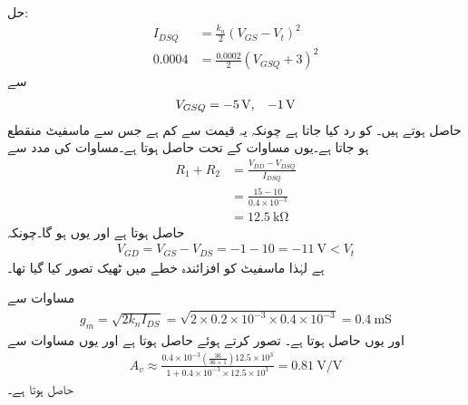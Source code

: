 حل:
\begin{align*}
I_{DSQ}&=\frac{k_n}{2} \left(V_{GS}-V_t \right)^2\\
0.0004&=\frac{0.0002}{2} \left(V_{GSQ}+3 \right)^2
\end{align*}
سے
\begin{align*}
V_{GSQ}=\SI{-5}{\volt},\hspace{3mm} \SI{-1}{\volt}
\end{align*}
حاصل ہوتے ہیں۔ کو رد کیا جاتا ہے چونکہ یہ قیمت  سے کم ہے جس سے ماسفیٹ منقطع ہو جاتا ہے۔یوں مساوات  کے تحت  حاصل ہوتا ہے۔مساوات  کی مدد سے
\begin{align*}
R_1+R_2&=\frac{V_{DD}-V_{DSQ}}{I_{DSQ}}\\
&=\frac{15-10}{0.4 \times 10^{-3}}\\
&=\SI{12.5}{\kilo \ohm}
\end{align*}
حاصل ہوتا ہے اور یوں  ہو گا۔چونکہ
\begin{align*}
V_{GD}=V_{GS}-V_{DS}=-1-10=\SI{-11}{\volt} < V_t
\end{align*}
ہے لہٰذا ماسفیٹ کو افزائندہ خطے میں ٹھیک تصور کیا گیا تھا۔

مساوات  سے 
\begin{align*}
g_m=\sqrt{2 k_n I_{DS}}=\sqrt{2 \times 0.2 \times 10^{-3} \times 0.4 \times 10^{-3}}=\SI{0.4}{\milli \siemens}
\end{align*}
اور یوں  حاصل ہوتا ہے۔ تصور کرتے ہوئے  حاصل ہوتا ہے اور یوں مساوات  سے
\begin{align*}
A_v \approx \frac{0.4 \times 10^{-3} \left(\frac{36}{36+1}\right) 12.5 \times 10^{3}}{1+0.4 \times 10^{-3}\times 12.5 \times 10^{3}}=\SI[per=frac,fraction=nice]{0.81}{\volt \per \volt}
\end{align*}
حاصل ہوتا ہے۔

